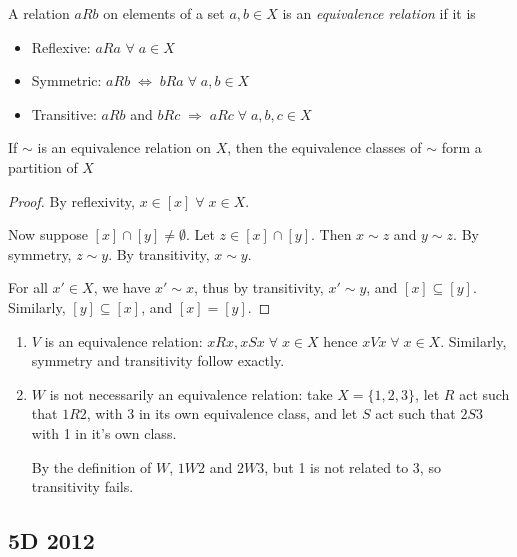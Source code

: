\documentclass[a4paper]{article}
\begin{document}
A relation $ a R b $ on elements of a set $ a,b \in X $ is an \emph{equivalence relation} if it is

\begin{itemize}
	\item Reflexive: $ a R a $ $ \forall \; a \in X $
	\item Symmetric: $ a R b \; \iff \; b R a \; \forall \; a,b \in X $
	\item Transitive: $ a R b $ and $ b R c \; \Rightarrow \; a R c \; \forall \; a,b,c \in X$
\end{itemize}

If $ \sim  $ is an equivalence relation on $ X $, then the equivalence classes of $ \sim $ form a partition of $ X $

\begin{proof}
	By reflexivity, $ x \in [x] \; \forall \; x \in X$.
	
	Now suppose $ [x] \cap [y] \neq \emptyset $. Let $ z \in [x] \cap [y] $.
	Then $ x \sim z $ and $ y \sim z $. By symmetry, $ z \sim y $. By transitivity, $ x \sim y $.
	
	For all $ x' \in X$, we have $ x' \sim x $, thus by transitivity, $ x' \sim y $, and $ [x] \subseteq [y] $. Similarly, $ [y] \subseteq [x] $, and $ [x] = [y] $.
\end{proof}

\begin{enumerate}
	\item $ V $ is an equivalence relation:
	$ x R x, x S x \; \forall \; x \in X  $ hence $ x V x \; \forall \; x \in X $. Similarly, symmetry and transitivity follow exactly.
	
	\item $ W $ is not necessarily an equivalence relation: take $ X = \{  1,2,3 \} $, let $ R $ act such that $ 1 R 2 $, with 3 in its own equivalence class, and let $ S $ act such that $ 2 S 3 $ with 1 in it's own class.
	
	By the definition of $ W $, $ 1 W 2 $ and $ 2 W 3 $, but 1 is not related to 3, so transitivity fails. 
\end{enumerate}

\subsection*{5D 2012}
\end{document}
